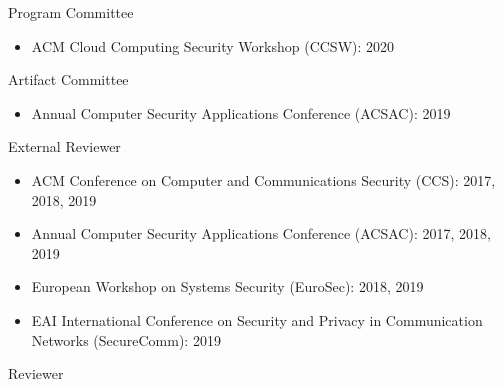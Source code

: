 

\vspace{10pt}
\cventry
    {} %
    {Program Committee} %
    {} %
    {} %
    {}
\vspace{-45pt}

\begin{itemize}[leftmargin=15pt]
\item[\space] ACM Cloud Computing Security Workshop (CCSW): 2020
\end{itemize}

\vspace{10pt}
\cventry
    {} %
    {Artifact Committee} %
    {} %
    {} %
    {}
\vspace{-45pt}

\begin{itemize}[leftmargin=15pt]
\item[\space] Annual Computer Security Applications Conference (ACSAC): 2019
\end{itemize}

\vspace{10pt}
\cventry
    {} %
    {External Reviewer} %
    {} %
    {} %
    {}
\vspace{-45pt}

\begin{itemize}[leftmargin=15pt]
\item[\space] ACM Conference on Computer and Communications Security (CCS): 2017, 2018, 2019
\item[\space] Annual Computer Security Applications Conference (ACSAC): 2017, 2018, 2019
\item[\space] European Workshop on Systems Security (EuroSec): 2018, 2019
\item[\space] EAI International Conference on Security and Privacy in Communication Networks (SecureComm): 2019
\end{itemize}

\vspace{10pt}
\cventry
    {} %
    {Reviewer} %
    {} %
    {} %
    {}
\vspace{-45pt}

